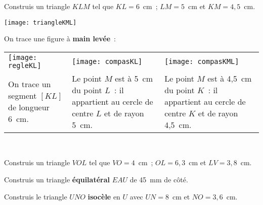 

\begin{methode*1}

\begin{exemple*1}
Construis un triangle $KLM$ tel que $KL = 6$ cm ; $LM = 5$ cm et $KM = 4,5$ cm.

\begin{center} \texttt{[image: triangleKML]} \end{center}

On trace une figure à \textbf{main levée} :

\begin{tabularx}{\textwidth}{X|X|X}
 \texttt{[image: regleKL]} &  \texttt{[image: compasKL]} & \texttt{[image: compasKML]} \\ 
 On trace un segment $[KL]$ de longueur 6 cm. & Le point $M$ est à 5 cm du point $L$ : il appartient au cercle de centre $L$ et de rayon 5 cm. & Le point $M$ est à 4,5 cm du point $K$ : il appartient au cercle de centre $K$ et de rayon 4,5 cm. \\
\end{tabularx} \\

\end{exemple*1}

\exercice 
Construis un triangle $VOL$ tel que $VO = 4$ cm ; $OL = 6,3$ cm et $LV = 3,8$ cm.

\exercice 
Construis un triangle \textbf{équilatéral} $EAU$ de 45 mm de côté.
     
\exercice 
Construis le triangle $UNO$ \textbf{isocèle} en $U$ avec $UN = 8$ cm et $NO = 3,6$ cm.
 
\end{methode*1}


